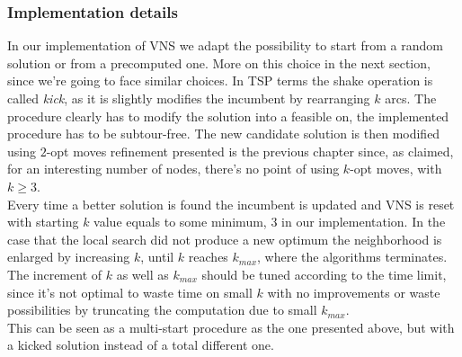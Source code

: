 \subsubsection{Implementation details}
In our implementation of VNS we adapt the possibility to start from a random
solution or from a precomputed one. More on this choice in the next section,
since we're going to face similar choices. In TSP terms the shake operation is
called \emph{kick}, as it is slightly modifies the incumbent by rearranging $k$
arcs. The procedure clearly has to modify the solution into a feasible on, the
implemented procedure has to be subtour-free. The new candidate solution is then
modified using $2$-opt moves refinement presented is the previous chapter since,
as claimed, for an interesting number of nodes, there's no point of using
$k$-opt moves, with $k \ge 3$.\\ 
Every time a better solution is found the incumbent is updated and VNS is reset
with starting $k$ value equals to some minimum, 3 in our implementation. In the
case that the local search did not produce a new optimum the neighborhood is
enlarged by increasing $k$, until $k$ reaches $k_{max}$, where the algorithms
terminates. The increment of $k$ as well as $k_{max}$ should be tuned according
to the time limit, since it's not optimal to waste time on small $k$ with no
improvements or waste possibilities by truncating the computation due to small
$k_{max}$.\\
This can be seen as a multi-start procedure as the one presented above, but with
a kicked solution instead of a total different one.


